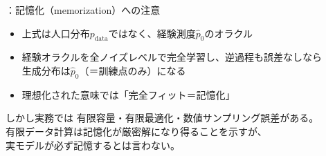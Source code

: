 \assuppl
\begin{frame}{\supplmark：記憶化（memorization）への注意}
    \begin{itemize}
        \item 上式は人口分布$p_{\mathrm{data}}$ではなく、経験測度$\hat{p}_0$のオラクル
        \item 経験オラクルを全ノイズレベルで完全学習し、逆過程も誤差なしなら\\
        生成分布は$\hat{p}_0$（＝訓練点のみ）になる
        \item 理想化された意味では「完全フィット＝記憶化」
    \end{itemize}
    \begin{alertblock}{しかし実務では}
        有限容量・有限最適化・数値サンプリング誤差がある。\\
        有限データ計算は記憶化が厳密解になり得ることを示すが、\\
        実モデルが必ず記憶するとは言わない。
    \end{alertblock}
\end{frame}
